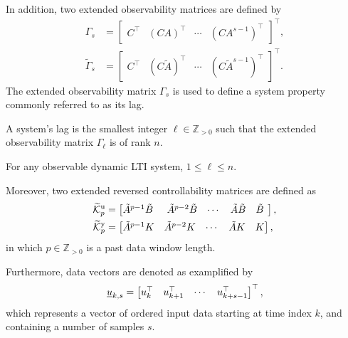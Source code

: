 In addition, two extended observability matrices are defined by
\begin{align*}
\Gamma_s &= \begin{bmatrix}C^\top & (CA)^\top & \cdots & (CA^{s-1})^\top\end{bmatrix}^\top,\\%
\widetilde{\Gamma}_s &= \begin{bmatrix}C^\top & (C\tilde{A})^\top & \cdots & (C\tilde{A}^{s-1})^\top\end{bmatrix}^\top.
\end{align*}
The extended observability matrix $\Gamma_s$ is used to define a system property commonly referred to as its lag.
\begin{defn}\label{def:lag}
    A system's lag is the smallest integer $\ell\in\mathbb{Z}_{>0}$ such that the extended observability matrix $\Gamma_\ell$ is of rank $n$.
\end{defn}
For any observable dynamic \ac{LTI} system, $1\leq \ell \leq n$.

Moreover, two extended reversed controllability matrices are defined as 
\begin{align*}
\tKp{u} &= \begin{bmatrix} \tilde{A}^{p-1}\tilde{B}\:\, & \tilde{A}^{p-2}\tilde{B} & \cdots & \tilde{A}\tilde{B} & \tilde{B}\:\, \end{bmatrix},\\%
\tKp{y} &= \begin{bmatrix} \tilde{A}^{p-1}K & \tilde{A}^{p-2}K & \cdots & \tilde{A}K & K \end{bmatrix},
\end{align*}
in which $p\in\mathbb{Z}_{>0}$ is a past data window length.

Furthermore, data vectors are denoted as examplified by
\begin{align*}
    \underline{u}_{k,s} = \begin{bmatrix} u_k^\top & u_{k+1}^\top & \cdots & u_{k+s-1}^\top\end{bmatrix}^\top,
\end{align*}
which represents a vector of ordered input data starting at time index $k$, and containing a number of samples $s$.

